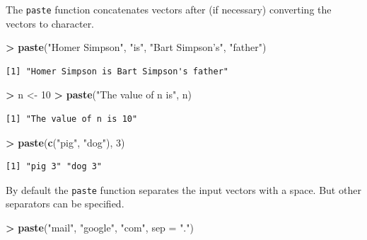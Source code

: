 \documentclass[]{krantz}
\makeatletter
\newenvironment{Shaded}{\begin{snugshade}}{\end{snugshade}}
\newcommand{\DataTypeTok}[1]{\textcolor[rgb]{0.27,0.27,0.27}{#1}}
\newcommand{\DecValTok}[1]{\textcolor[rgb]{0.06,0.06,0.06}{#1}}
\newcommand{\KeywordTok}[1]{\textcolor[rgb]{0.27,0.27,0.27}{\textbf{#1}}}
\newcommand{\NormalTok}[1]{#1}
\newcommand{\OperatorTok}[1]{\textcolor[rgb]{0.43,0.43,0.43}{\textbf{#1}}}
\newcommand{\StringTok}[1]{\textcolor[rgb]{0.5,0.5,0.5}{#1}}
\newenvironment{kframe}{%
\medskip{}
\setlength{\fboxsep}{.8em}
 \def\at@end@of@kframe{}%
 \ifinner\ifhmode%
  \def\at@end@of@kframe{\end{minipage}}%
  \begin{minipage}{\columnwidth}%
 \fi\fi%
 \def\FrameCommand##1{\hskip\@totalleftmargin \hskip-\fboxsep
 \colorbox{shadecolor}{##1}\hskip-\fboxsep
     \hskip-\linewidth \hskip-\@totalleftmargin \hskip\columnwidth}%
 \MakeFramed {\advance\hsize-\width
   \@totalleftmargin\z@ \linewidth\hsize
   \@setminipage}}%
 {\par\unskip\endMakeFramed%
 \at@end@of@kframe}
\renewenvironment{Shaded}{\begin{kframe}}{\end{kframe}}
\makeatother
\begin{document}
The \texttt{paste} function concatenates vectors after (if necessary) converting the vectors to character.

\begin{Shaded}
\begin{Highlighting}[]
\OperatorTok{>}\StringTok{ }\KeywordTok{paste}\NormalTok{(}\StringTok{"Homer Simpson"}\NormalTok{, }\StringTok{"is"}\NormalTok{, }\StringTok{"Bart Simpson's"}\NormalTok{, }\StringTok{"father"}\NormalTok{)}
\end{Highlighting}
\end{Shaded}

\begin{verbatim}
[1] "Homer Simpson is Bart Simpson's father"
\end{verbatim}

\begin{Shaded}
\begin{Highlighting}[]
\OperatorTok{>}\StringTok{ }\NormalTok{n <-}\StringTok{ }\DecValTok{10}
\OperatorTok{>}\StringTok{ }\KeywordTok{paste}\NormalTok{(}\StringTok{"The value of n is"}\NormalTok{, n)}
\end{Highlighting}
\end{Shaded}

\begin{verbatim}
[1] "The value of n is 10"
\end{verbatim}

\begin{Shaded}
\begin{Highlighting}[]
\OperatorTok{>}\StringTok{ }\KeywordTok{paste}\NormalTok{(}\KeywordTok{c}\NormalTok{(}\StringTok{"pig"}\NormalTok{, }\StringTok{"dog"}\NormalTok{), }\DecValTok{3}\NormalTok{)}
\end{Highlighting}
\end{Shaded}

\begin{verbatim}
[1] "pig 3" "dog 3"
\end{verbatim}

By default the \texttt{paste} function separates the input vectors with a space. But other separators can be specified.

\begin{Shaded}
\begin{Highlighting}[]
\OperatorTok{>}\StringTok{ }\KeywordTok{paste}\NormalTok{(}\StringTok{"mail"}\NormalTok{, }\StringTok{"google"}\NormalTok{, }\StringTok{"com"}\NormalTok{, }\DataTypeTok{sep =} \StringTok{"."}\NormalTok{)}
\end{Highlighting}
\end{Shaded}
\end{document}
